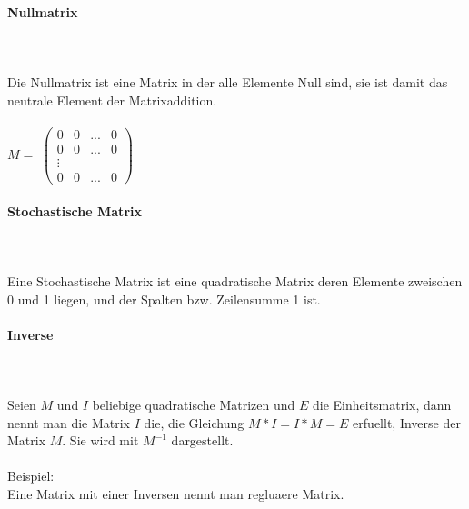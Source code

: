 \documentclass[a4paper]{article} %
\begin{document}
		\paragraph{Nullmatrix  } 
		\hspace{0 cm} \\ \noindent \\
		Die Nullmatrix ist eine Matrix in der alle Elemente Null sind, sie ist damit das neutrale Element der Matrixaddition.\\
		\\$M =$
		$
		\begin{pmatrix}
		0 & 0 	& ... 	& 0\\
		0 & 0 	& ...	& 0\\
		\vdots  &      	&  \\
		0 & 0	& ...	& 0
		\end{pmatrix}
		$\\
	
	\paragraph{Stochastische Matrix  } 
	\hspace{0 cm} \\ \noindent \\
	Eine Stochastische Matrix ist eine quadratische Matrix deren Elemente zweischen 0 und 1 liegen, und der Spalten bzw. Zeilensumme 1 ist.
	
	\paragraph{Inverse  } 
	 \hspace{0 cm} \\ \noindent \\
	 Seien  $M$ und $I$ beliebige quadratische Matrizen und $E$ die Einheitsmatrix, dann nennt man die Matrix $I$ die, die Gleichung $M*I=I*M=E$ erfuellt, Inverse der Matrix $M$. Sie wird mit $M^{-1}$ dargestellt.\\\\
	 Beispiel:\\
	 Eine Matrix mit einer Inversen nennt man regluaere Matrix.
	
\end{document}
